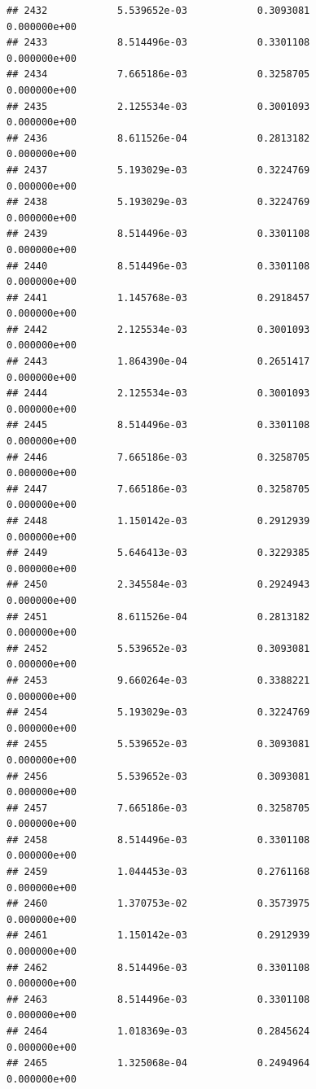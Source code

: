 \documentclass[
]{article}
\begin{document}
\begin{verbatim}
## 2432            5.539652e-03            0.3093081            0.000000e+00
## 2433            8.514496e-03            0.3301108            0.000000e+00
## 2434            7.665186e-03            0.3258705            0.000000e+00
## 2435            2.125534e-03            0.3001093            0.000000e+00
## 2436            8.611526e-04            0.2813182            0.000000e+00
## 2437            5.193029e-03            0.3224769            0.000000e+00
## 2438            5.193029e-03            0.3224769            0.000000e+00
## 2439            8.514496e-03            0.3301108            0.000000e+00
## 2440            8.514496e-03            0.3301108            0.000000e+00
## 2441            1.145768e-03            0.2918457            0.000000e+00
## 2442            2.125534e-03            0.3001093            0.000000e+00
## 2443            1.864390e-04            0.2651417            0.000000e+00
## 2444            2.125534e-03            0.3001093            0.000000e+00
## 2445            8.514496e-03            0.3301108            0.000000e+00
## 2446            7.665186e-03            0.3258705            0.000000e+00
## 2447            7.665186e-03            0.3258705            0.000000e+00
## 2448            1.150142e-03            0.2912939            0.000000e+00
## 2449            5.646413e-03            0.3229385            0.000000e+00
## 2450            2.345584e-03            0.2924943            0.000000e+00
## 2451            8.611526e-04            0.2813182            0.000000e+00
## 2452            5.539652e-03            0.3093081            0.000000e+00
## 2453            9.660264e-03            0.3388221            0.000000e+00
## 2454            5.193029e-03            0.3224769            0.000000e+00
## 2455            5.539652e-03            0.3093081            0.000000e+00
## 2456            5.539652e-03            0.3093081            0.000000e+00
## 2457            7.665186e-03            0.3258705            0.000000e+00
## 2458            8.514496e-03            0.3301108            0.000000e+00
## 2459            1.044453e-03            0.2761168            0.000000e+00
## 2460            1.370753e-02            0.3573975            0.000000e+00
## 2461            1.150142e-03            0.2912939            0.000000e+00
## 2462            8.514496e-03            0.3301108            0.000000e+00
## 2463            8.514496e-03            0.3301108            0.000000e+00
## 2464            1.018369e-03            0.2845624            0.000000e+00
## 2465            1.325068e-04            0.2494964            0.000000e+00

\end{verbatim}
\end{document}
